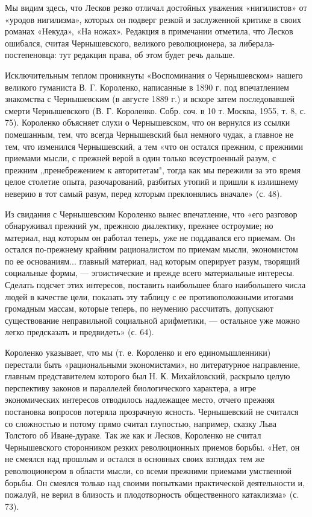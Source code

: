 Мы видим здесь, что Лесков резко отличал достойных уважения «нигилистов» от
«уродов нигилизма», которых он подверг резкой и заслуженной критике в своих
романах «Некуда», «На ножах». Редакция в примечании отметила, что Лесков
ошибался, считая Чернышевского, великого революционера, за
либерала-постепеновца: тут редакция права, об этом будет речь дальше.

Исключительным теплом проникнуты «Воспоминания о Чернышевском» нашего
великого гуманиста В. Г. Короленко, написанные в 1890 г. под
впечатлением знакомства с Чернышевским (в августе 1889 г.) и вскоре
затем последовавшей смерти Чернышевского (В. Г. Короленко. Собр. соч.
в 10 т. Москва, 1955, т. 8, с. 75). Короленко объясняет слухи о
Чернышевском, что он вернулся из ссылки помешанным, тем, что всегда
Чернышевский был немного чудак, а главное не тем, что изменился
Чернышевский, а тем «что он остался прежним, с прежними приемами
мысли, с прежней верой в один только всеустроенный разум, с прежним
„пренебрежением к авторитетам", тогда как мы пережили за это время
целое столетие опыта, разочарований, разбитых утопий и пришли к
излишнему неверию в тот самый разум, перед которым преклонялись
вначале» (с. 48).

Из свидания с Чернышевским Короленко вынес впечатление, что «его разговор
обнаруживал прежний ум, прежнюю диалектику, прежнее остроумие; но материал, над
которым он работал теперь, уже не поддавался его приемам. Он остался
по-прежнему крайним рационалистом по приемам мысли, экономистом по ее
основаниям... главный материал, над которым оперирует разум, творящий
социальные формы, --- эгоистические и прежде всего материальные интересы. Сделать
подсчет этих интересов, поставить наибольшее благо наибольшего числа людей в
качестве цели, показать эту таблицу с ее противоположными итогами
громадным массам, которые теперь, по неумению рассчитать, допускают
существование неправильной социальной арифметики, --- остальное уже можно легко
предсказать и предвидеть» (с. 64).

Короленко указывает, что мы (т. е. Короленко и его единомышленники) перестали
быть «рациональными экономистами», но литературное направление, главным
представителем которого был Н. К. Михайловский, раскрыло целую перспективу
законов и параллелей биологического характера, а игре экономических интересов
отводилось надлежащее место, отчего прежняя постановка вопросов потеряла
прозрачную ясность. Чернышевский не считался со сложностью и потому прямо
считал глупостью, например, сказку Льва Толстого об Иване-дураке. Так же как и
Лесков, Короленко не считал Чернышевского сторонником резких революционных
приемов борьбы. «Нет, он не смеялся над прошлым и остался в основных своих
взглядах тем же революционером в области мысли, со всеми прежними приемами
умственной борьбы. Он смеялся только над своими попытками практической
деятельности и, пожалуй, не верил в близость и плодотворность общественного
катаклизма» (с. 73).

